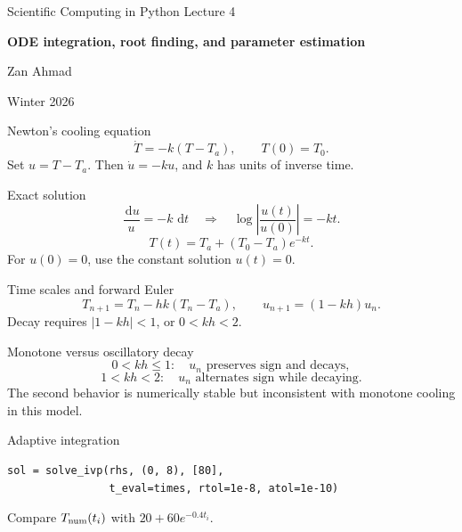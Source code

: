 \documentclass[aspectratio=169,11pt]{beamer}
\providecommand{\dd}{\,\mathrm{d}}\providecommand{\R}{\mathbb{R}}
\newcommand{\notestarget}{notes.pdf}\newcommand{\noteslabel}{Notes}
\begin{document}
\begin{frame}[plain]\vfill
{\small\color{accent} Scientific Computing in Python \quad Lecture 4}\par\medskip
{\raggedright{}\LARGE\bfseries\color{ink} ODE integration, root finding, and parameter estimation}\par\bigskip
Zan Ahmad\par\smallskip
{\small Winter 2026}\par\vfill\end{frame}
\renewcommand{\notestarget}{notes.pdf\#note-newton-s-cooling-equation}
\begin{frame}[t,fragile,label=slide-newton-s-cooling-equation]{Newton's cooling equation}
\[
\dot T=-k(T-T_a),\qquad T(0)=T_0.
\]
\pause{}
Set $u=T-T_a$. Then $\dot u=-ku$, and $k$ has units of inverse time.
\end{frame}
\renewcommand{\notestarget}{notes.pdf\#note-newton-s-cooling-equation}
\begin{frame}[t,fragile,label=slide-exact-solution]{Exact solution}
\[
\frac{\dd u}{u}=-k\,\dd t
\quad\Longrightarrow\quad
\log\left|\frac{u(t)}{u(0)}\right|=-kt.
\]
\pause{}
\[
T(t)=T_a+(T_0-T_a)e^{-kt}.
\] For $u(0)=0$, use the constant solution $u(t)=0$.
\end{frame}
\renewcommand{\notestarget}{notes.pdf\#note-time-scales-and-forward-euler}
\begin{frame}[t,fragile,label=slide-time-scales-and-forward-euler]{Time scales and forward Euler}
\[
T_{n+1}=T_n-hk(T_n-T_a),\qquad
u_{n+1}=(1-kh)u_n.
\]
\pause{}
Decay requires $|1-kh|<1$, or $0<kh<2$.
\end{frame}
\renewcommand{\notestarget}{notes.pdf\#note-time-scales-and-forward-euler}
\begin{frame}[t,fragile,label=slide-monotone-versus-oscillatory-decay]{Monotone versus oscillatory decay}
\[
0<kh\leq1:\quad u_n\text{ preserves sign and decays},
\]
\pause{}
\[
1<kh<2:\quad u_n\text{ alternates sign while decaying}.
\]
The second behavior is numerically stable but inconsistent with monotone cooling in this model.
\end{frame}
\renewcommand{\notestarget}{notes.pdf\#note-adaptive-integration}
\begin{frame}[t,fragile,label=slide-adaptive-integration]{Adaptive integration}
\begin{verbatim}
sol = solve_ivp(rhs, (0, 8), [80],
                t_eval=times, rtol=1e-8, atol=1e-10)
\end{verbatim}
\pause{}
Compare $T_{\rm num}(t_i)$ with $20+60e^{-0.4t_i}$.
\end{frame}
\end{document}

